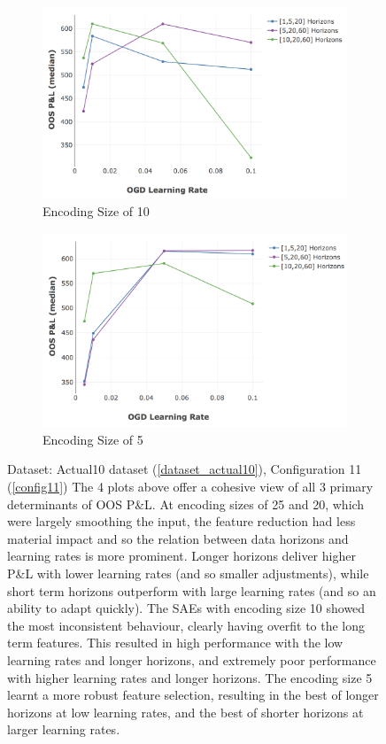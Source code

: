 \documentclass[a4paper,11pt,oneside]{article}
\theoremstyle{plain}
\theoremstyle{definition}
\begin{document}
\begin{figure}[H]
			\begin{subfigure}{0.48\linewidth}
				\centering\includegraphics[scale=0.33]{images/results/8_2_determinants/OOS_OGDLR_Delta_Encoding_10_median.png}
				\caption{Encoding Size of 10}
			\end{subfigure}%
			\begin{subfigure}{0.49\linewidth}
				\centering\includegraphics[scale=0.33]{images/results/8_2_determinants/OOS_OGDLR_Delta_Encoding_5_median.png}
				\caption{Encoding Size of 5}
			\end{subfigure}
		\caption[OOS P\&L By Feature Selection Size, OGD Learning Rate and Data Horizons]
		{Dataset: Actual10 dataset (\ref{dataset_actual10}), Configuration 11 (\ref{config11})		
			\newline The 4 plots above offer a cohesive view of all 3 primary determinants of OOS P\&L. At encoding sizes of 25 and 20, which were largely smoothing the input, the feature reduction had less material impact and so the relation between data horizons and learning rates is more prominent. Longer horizons deliver higher P\&L with lower learning rates (and so smaller adjustments), while short term horizons outperform with large learning rates (and so an ability to adapt quickly). The SAEs with encoding size 10 showed the most inconsistent behaviour, clearly having overfit to the long term features. This resulted in high performance with the low learning rates and longer horizons, and extremely poor performance with higher learning rates and longer horizons. The encoding size 5 learnt a more robust feature selection, resulting in the best of longer horizons at low learning rates, and the best of shorter horizons at larger learning rates. }

\end{figure}
\end{document}
